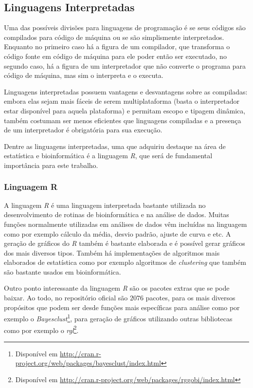 \subsection{Linguagens Interpretadas}

Uma das possíveis divisões para linguagens de programação é se seus códigos são compilados para código de máquina ou se são simplismente 
interpretados. Enquanto no primeiro caso há a figura de um compilador, que transforma o código fonte em código de máquina 
para ele poder então ser executado, no segundo caso,
há a figura de um interpretador que não converte o programa para 
código de máquina, mas sim o interpreta e o executa. 

Linguagens interpretadas possuem vantagens e desvantagens sobre as compiladas: embora elas sejam mais fáceis 
de serem multiplataforma (basta o interpretador
estar disponível para aquela plataforma) e permitam escopo e tipagem dinâmica, também costumam ser menos eficientes que linguagens compiladas e 
a presença de um interpretador é obrigatória para sua execução. 

Dentre as linguagens interpretadas, uma que adquiriu destaque na área de estatística e bioinformática é a linguagem \emph{R}, que 
será de fundamental importância para este trabalho. 


\subsubsection{Linguagem R}

A linguagem \emph{R} é uma linguagem interpretada bastante utilizada no desenvolvimento de rotinas de bioinformática e na análise de
dados. Muitas funções normalmente utilizadas em análises de dados vêm incluídas na linguagem como por exemplo cálculo da
 média, desvio padrão, ajuste de curva e etc. A geração de gráficos do \emph{R} também é bastante elaborada e é possível 
gerar gráficos dos mais diversos tipos. Também há implementações de algoritmos mais elaborados de estatística como por 
exemplo algoritmos de \emph{clustering} que também são bastante usados em bioinformática.

Outro ponto interessante da linguagem \emph{R} são os pacotes extras que se pode baixar. Ao todo, no repositório oficial
são $2076$ pacotes, para os mais diversos propósitos que podem ser desde funções mais específicas para análise como 
por exemplo o \emph{Bayesclust}\footnote{Disponível em \url{http://cran.r-project.org/web/packages/bayesclust/index.html}}, 
para geração de gráficos utilizando outras bibliotecas como por exemplo o 
\emph{rgl}\footnote{Disponível em \url{http://cran.r-project.org/web/packages/rggobi/index.html}}. 

